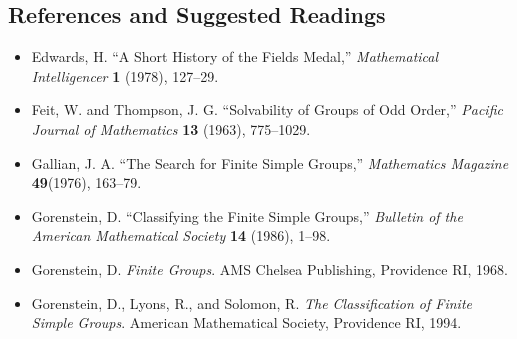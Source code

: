  
 
\subsection*{References and Suggested Readings}  %
 
 
{\small
\begin{itemize}
 
\item[{\bf [1]}]
Edwards, H. ``A Short History of the Fields Medal,'' {\it
Mathematical Intelligencer} {\bf 1} (1978), 127--29.
 
\item[{\bf [2]}]
Feit, W. and Thompson, J. G. ``Solvability of Groups of Odd
Order,'' {\it Pacific Journal of Mathematics} {\bf
13} (1963), 775--1029.
 
\item[{\bf [3]}]
Gallian, J. A. ``The Search for Finite Simple Groups,''
{\it Mathematics Magazine} {\bf 49}(1976), 163--79.
 
\item[{\bf [4]}]
Gorenstein, D. ``Classifying the Finite Simple Groups,''
{\it Bulletin of the American Mathematical Society} {\bf
14} (1986), 1--98.
 
\item[{\bf [5]}]
Gorenstein, D. {\it Finite Groups}. AMS Chelsea Publishing, Providence RI, 1968.

\item[{\bf [6]}]
Gorenstein, D., Lyons, R., and Solomon, R. {\it The Classification of Finite Simple
Groups}.
American Mathematical Society, Providence RI, 1994.
 
\end{itemize}
}
 
\sagesection
 
